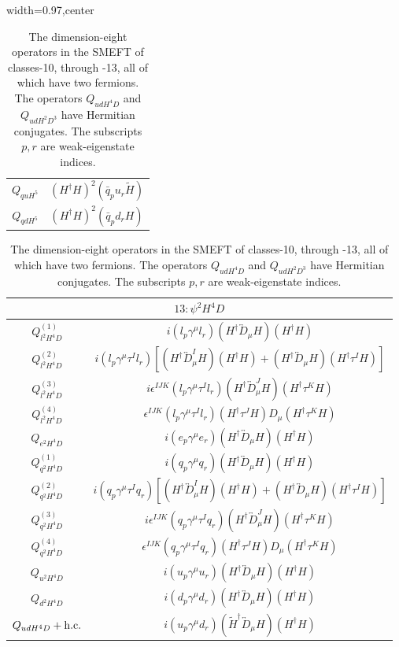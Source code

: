 \begin{table}[H]
\begin{center}
\begin{adjustbox}{width=0.97\textwidth,center}
\begin{minipage}[t]{3.7cm}
\begin{tabular}[t]{c|c}
%
$Q_{quH^5}$  & $(H^\dag H)^2 (\bar q_p u_r \widetilde H )$ \\
%
$Q_{qdH^5}$  & $(H^\dag H)^2 (\bar q_p d_r H)$
\end{tabular}
\end{minipage}
\hspace{1cm}
\begin{minipage}[t]{9.9cm}
\renewcommand{\arraystretch}{1.5}
\begin{tabular}[t]{c|c}
\multicolumn{2}{c}{\boldmath$13:\psi^2H^4D$} \\
\hline
$Q_{l^2H^4D}^{(1)}$  &  $ i (l_p \gamma^{\mu} l_r) (H^{\dag} \overleftrightarrow{D}_{\mu} H) (H^{\dag} H)$ \\
%
$Q_{l^2H^4D}^{(2)}$  &  $ i (l_p \gamma^{\mu} \tau^I l_r) [(H^{\dag} \overleftrightarrow{D}_{\mu}^I H) (H^{\dag} H) + (H^{\dag} \overleftrightarrow{D}_{\mu} H) (H^{\dag} \tau^I H)]$ \\
%
$Q_{l^2H^4D}^{(3)}$  &  $ i \epsilon^{IJK} (l_p \gamma^{\mu} \tau^I l_r) (H^{\dag} \overleftrightarrow{D}_{\mu}^J H) (H^{\dag} \tau^K H)$ \\
%
$Q_{l^2H^4D}^{(4)}$  &  $ \epsilon^{IJK} (l_p \gamma^{\mu} \tau^I l_r) (H^{\dag} \tau^J H) D_{\mu} (H^{\dag} \tau^K H)$ \\
%
$Q_{e^2H^4D}$  &  $ i (e_p \gamma^{\mu} e_r) (H^{\dag} \overleftrightarrow{D}_{\mu} H) (H^{\dag} H)$ \\
%
$Q_{q^2H^4D}^{(1)}$  &  $ i (q_p \gamma^{\mu} q_r) (H^{\dag} \overleftrightarrow{D}_{\mu} H) (H^{\dag} H)$ \\
%
$Q_{q^2H^4D}^{(2)}$  &  $ i (q_p \gamma^{\mu} \tau^I q_r) [(H^{\dag} \overleftrightarrow{D}_{\mu}^I H) (H^{\dag} H) + (H^{\dag} \overleftrightarrow{D}_{\mu} H) (H^{\dag} \tau^I H)]$ \\
%
$Q_{q^2H^4D}^{(3)}$  &  $ i \epsilon^{IJK} (q_p \gamma^{\mu} \tau^I q_r) (H^{\dag} \overleftrightarrow{D}_{\mu}^J H) (H^{\dag} \tau^K H)$ \\
%
$Q_{q^2H^4D}^{(4)}$  &  $ \epsilon^{IJK} (q_p \gamma^{\mu} \tau^I q_r) (H^{\dag} \tau^J H) D_{\mu} (H^{\dag} \tau^K H)$ \\
%
$Q_{u^2H^4D}$  &  $ i (u_p \gamma^{\mu} u_r) (H^{\dag} \overleftrightarrow{D}_{\mu} H) (H^{\dag} H)$ \\
%
$Q_{d^2H^4D}$  &  $ i (d_p \gamma^{\mu} d_r) (H^{\dag} \overleftrightarrow{D}_{\mu} H) (H^{\dag} H)$ \\
%
$Q_{udH^4D} + \mathrm{h.c.}$  &  $ i (u_p \gamma^{\mu} d_r) (\widetilde H^{\dag} \overleftrightarrow{D}_{\mu} H) (H^{\dag} H)$
\end{tabular}
\end{minipage}
\end{adjustbox}
\end{center}
\caption{The dimension-eight operators in the SMEFT of classes-10, through -13, all of which have two fermions. The operators $Q_{udH^4D}$ and $Q_{udH^2D^3}$ have Hermitian conjugates. The subscripts $p, r$ are weak-eigenstate indices.}
\label{tab:smeft8class_10_11_12_13}
\end{table}

